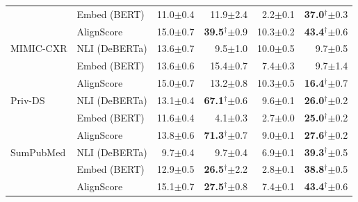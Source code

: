 \begin{table}[t]
\begin{tabular}{ll rr rr}
 & Embed (BERT) & 11.0{\scriptsize $\pm$0.4} & 11.9{\scriptsize $\pm$2.4} & 2.2{\scriptsize $\pm$0.1} & \textbf{37.0}$^\dagger${\scriptsize $\pm$0.3} \\
 & AlignScore & 15.0{\scriptsize $\pm$0.7} & \textbf{39.5}$^\dagger${\scriptsize $\pm$0.9} & 10.3{\scriptsize $\pm$0.2} & \textbf{43.4}$^\dagger${\scriptsize $\pm$0.6} \\
\midrule
MIMIC-CXR & NLI (DeBERTa) & 13.6{\scriptsize $\pm$0.7} & 9.5{\scriptsize $\pm$1.0} & 10.0{\scriptsize $\pm$0.5} & 9.7{\scriptsize $\pm$0.5} \\
 & Embed (BERT) & 13.6{\scriptsize $\pm$0.6} & 15.4{\scriptsize $\pm$0.7} & 7.4{\scriptsize $\pm$0.3} & 9.7{\scriptsize $\pm$1.4} \\
 & AlignScore & 15.0{\scriptsize $\pm$0.7} & 13.2{\scriptsize $\pm$0.8} & 10.3{\scriptsize $\pm$0.5} & \textbf{16.4}$^\dagger${\scriptsize $\pm$0.7} \\
\midrule
Priv-DS & NLI (DeBERTa) & 13.1{\scriptsize $\pm$0.4} & \textbf{67.1}$^\dagger${\scriptsize $\pm$0.6} & 9.6{\scriptsize $\pm$0.1} & \textbf{26.0}$^\dagger${\scriptsize $\pm$0.2} \\
 & Embed (BERT) & 11.6{\scriptsize $\pm$0.4} & 4.1{\scriptsize $\pm$0.3} & 2.7{\scriptsize $\pm$0.0} & \textbf{25.0}$^\dagger${\scriptsize $\pm$0.2} \\
 & AlignScore & 13.8{\scriptsize $\pm$0.6} & \textbf{71.3}$^\dagger${\scriptsize $\pm$0.7} & 9.0{\scriptsize $\pm$0.1} & \textbf{27.6}$^\dagger${\scriptsize $\pm$0.2} \\
\midrule
SumPubMed & NLI (DeBERTa) & 9.7{\scriptsize $\pm$0.4} & 9.7{\scriptsize $\pm$0.4} & 6.9{\scriptsize $\pm$0.1} & \textbf{39.3}$^\dagger${\scriptsize $\pm$0.5} \\
 & Embed (BERT) & 12.9{\scriptsize $\pm$0.5} & \textbf{26.5}$^\dagger${\scriptsize $\pm$2.2} & 2.8{\scriptsize $\pm$0.1} & \textbf{38.8}$^\dagger${\scriptsize $\pm$0.5} \\
 & AlignScore & 15.1{\scriptsize $\pm$0.7} & \textbf{27.5}$^\dagger${\scriptsize $\pm$0.8} & 7.4{\scriptsize $\pm$0.1} & \textbf{43.4}$^\dagger${\scriptsize $\pm$0.6} \\
\bottomrule
\end{tabular}
\end{table}